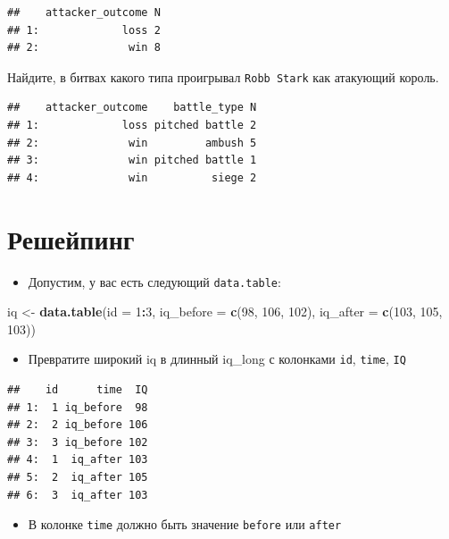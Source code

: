 \documentclass[]{book}
\newenvironment{Shaded}{\begin{snugshade}}{\end{snugshade}}
\newcommand{\KeywordTok}[1]{\textcolor[rgb]{0.13,0.29,0.53}{\textbf{#1}}}
\newcommand{\DataTypeTok}[1]{\textcolor[rgb]{0.13,0.29,0.53}{#1}}
\newcommand{\DecValTok}[1]{\textcolor[rgb]{0.00,0.00,0.81}{#1}}
\newcommand{\StringTok}[1]{\textcolor[rgb]{0.31,0.60,0.02}{#1}}
\newcommand{\OperatorTok}[1]{\textcolor[rgb]{0.81,0.36,0.00}{\textbf{#1}}}
\newcommand{\NormalTok}[1]{#1}
\providecommand{\tightlist}{%
  \setlength{\itemsep}{0pt}\setlength{\parskip}{0pt}}
\begin{document}
\begin{verbatim}
##    attacker_outcome N
## 1:             loss 2
## 2:              win 8
\end{verbatim}

Найдите, в битвах какого типа проигрывал \texttt{Robb\ Stark} как
атакующий король.

\begin{verbatim}
##    attacker_outcome    battle_type N
## 1:             loss pitched battle 2
## 2:              win         ambush 5
## 3:              win pitched battle 1
## 4:              win          siege 2
\end{verbatim}

\section{Решейпинг}\label{task_reshape}

\begin{itemize}
\tightlist
\item
  Допустим, у вас есть следующий \texttt{data.table}:
\end{itemize}

\begin{Shaded}
\begin{Highlighting}[]
\NormalTok{iq <-}\StringTok{ }\KeywordTok{data.table}\NormalTok{(}\DataTypeTok{id =} \DecValTok{1}\OperatorTok{:}\DecValTok{3}\NormalTok{, }\DataTypeTok{iq_before =} \KeywordTok{c}\NormalTok{(}\DecValTok{98}\NormalTok{, }\DecValTok{106}\NormalTok{, }\DecValTok{102}\NormalTok{), }\DataTypeTok{iq_after =} \KeywordTok{c}\NormalTok{(}\DecValTok{103}\NormalTok{, }\DecValTok{105}\NormalTok{, }\DecValTok{103}\NormalTok{))}
\end{Highlighting}
\end{Shaded}

\begin{itemize}
\tightlist
\item
  Превратите широкий iq в длинный iq\_long с колонками \texttt{id},
  \texttt{time}, \texttt{IQ}
\end{itemize}

\begin{verbatim}
##    id      time  IQ
## 1:  1 iq_before  98
## 2:  2 iq_before 106
## 3:  3 iq_before 102
## 4:  1  iq_after 103
## 5:  2  iq_after 105
## 6:  3  iq_after 103
\end{verbatim}

\begin{itemize}
\tightlist
\item
  В колонке \texttt{time} должно быть значение \texttt{before} или
  \texttt{after}
\end{itemize}
\end{document}
